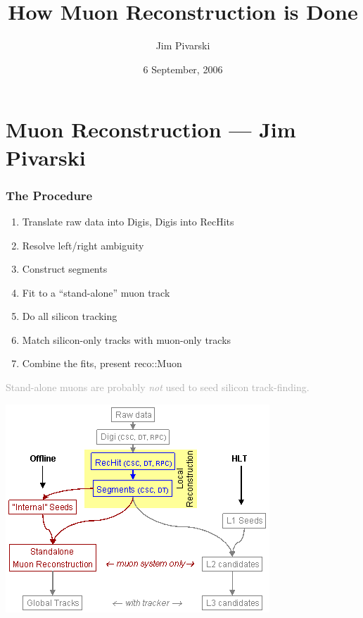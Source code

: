 \documentclass[12pt,compress]{beamer}
\title{How Muon Reconstruction is Done}
\author{Jim Pivarski}
\institute{Texas A\&M University}
\date{6 September, 2006}
\begin{document}
\addtocounter{page}{-1}
\frame{\titlepage}
\section*{Muon Reconstruction --- Jim Pivarski}

\begin{frame}
\frametitle{The Procedure}
\begin{enumerate}
\item Translate raw data into Digis, Digis into RecHits
\item Resolve left/right ambiguity
\item Construct segments
\item Fit to a ``stand-alone'' muon track
\item Do all silicon tracking
\item Match silicon-only tracks with muon-only tracks
\item Combine the fits, present reco::Muon
\end{enumerate}

\vfill
\textcolor{darkgray}{Stand-alone muons are probably {\it not} used to seed silicon track-finding.}


\end{frame}

\begin{frame}
\begin{center}
\includegraphics[width=0.8\linewidth]{muonreco.png}
\end{center}
\end{frame}
\end{document}
